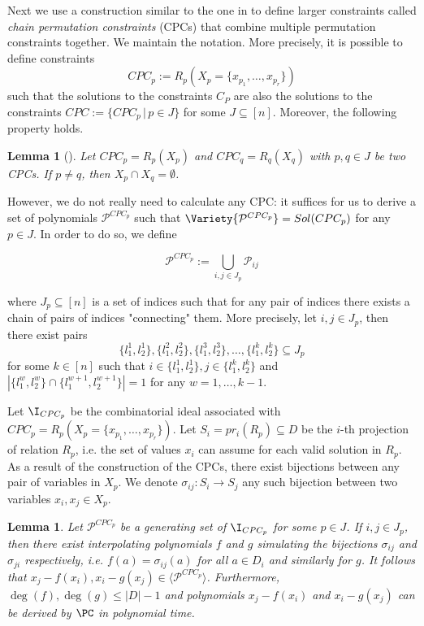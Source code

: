 \documentclass[11pt]{article}
\newtheorem{lemma}[theorem]{Lemma}
\begin{document}
Next we use a construction similar to the one in \cite{BharathiM21, BharathiM25} to define larger constraints called \emph{chain permutation constraints} (CPCs) that combine multiple permutation constraints together. We maintain the notation. More precisely, it is possible to define constraints
\begin{equation*}
    CPC_p := R_p(X_p = \{ x_{p_1}, \ldots, x_{p_r} \})
\end{equation*}
such that the solutions to the constraints $C_{P}$ are also the solutions to the constraints $CPC := \{CPC_p \, | \, p \in J\}$ for some $J \subseteq [n]$. Moreover, the following property holds.

\begin{lemma}[\cite{BharathiM21, BharathiM25}]
    Let $CPC_p = R_p(X_p)$ and $CPC_q = R_q(X_q)$ with $p,q \in J$ be two CPCs. If $p \neq q$, then $X_p \cap X_q = \emptyset$.
\end{lemma}

However, we do not really need to calculate any CPC: it suffices for us to derive a set of polynomials $\mathcal{P}^{CPC_p}$ such that $\Variety{\mathcal{P}^{CPC_p}} = Sol(CPC_p)$ for any $p \in J$. In order to do so, we define

\begin{equation*}
    \mathcal{P}^{CPC_p} := \bigcup_{i,j \in J_p} \mathcal{P}_{ij}
\end{equation*}

where $J_p \subseteq [n]$ is a set of indices such that for any pair of indices there exists a chain of pairs of indices "connecting" them. More precisely, let $i,j \in J_p$, then there exist pairs $$\{ l_1^1, l_2^1 \}, \{ l_1^2, l_2^2 \}, \{l_1^3, l_2^3\}, \ldots, \{l_1^k, l_2^k\} \subseteq J_p$$ for some $k \in [n]$ such that $i \in \{ l_1^1, l_2^1 \}, j \in \{l_1^k, l_2^k\}$ and $|\{l_1^w, l_2^w\} \cap \{l_1^{w+1}, l_2^{w+1}\}| = 1$ for any $w = 1, \ldots, k-1$.

Let $\I_{CPC_p}$ be the combinatorial ideal associated with $CPC_p = R_p(X_p = \{x_{p_1}, \ldots, x_{p_r} \})$. Let $S_i = pr_i(R_p) \subseteq D$ be the $i$-th projection of relation $R_p$, i.e. the set of values $x_i$ can assume for each valid solution in $R_p$. As a result of the construction of the CPCs, there exist bijections between any pair of variables in $X_p$. We denote $\sigma_{ij}: S_i \rightarrow S_j$ any such bijection between two variables $x_i, x_j \in X_p$.

\begin{lemma}
    Let $\mathcal{P}^{CPC_p}$ be a generating set of $\I_{CPC_p}$ for some $p \in J$. If $i,j \in J_p$, then there exist interpolating polynomials $f$ and $g$ simulating the bijections $\sigma_{ij}$ and $\sigma_{ji}$ respectively, i.e. $f(a) = \sigma_{ij}(a)$ for all $a \in D_i$ and similarly for $g$. It follows that $x_j - f(x_i), x_i - g(x_j) \in \langle \mathcal{P}^{CPC_p} \rangle$. Furthermore, $\deg(f), \deg(g) \leq |D| - 1$ and polynomials $x_j - f(x_i)$ and $ x_i - g(x_j)$ can be derived by $\PC$ in polynomial time.
\end{lemma}
\end{document}
